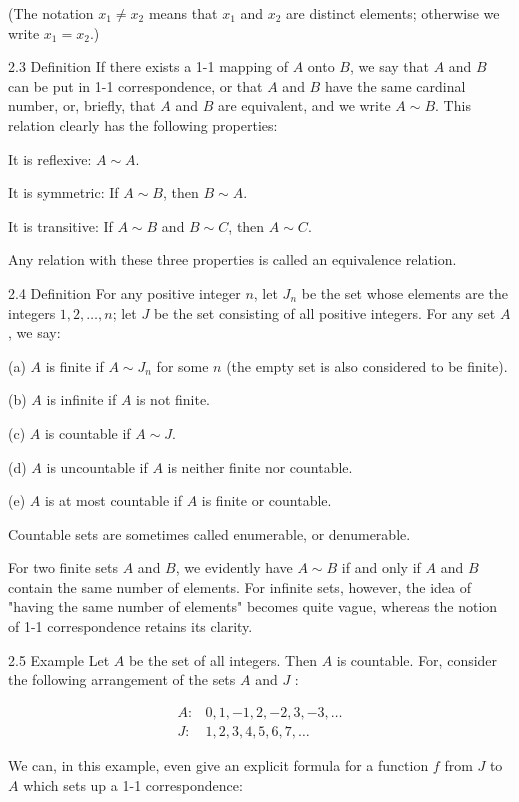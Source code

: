 \documentclass[10pt]{article}
\begin{document}
(The notation $x_{1} \neq x_{2}$ means that $x_{1}$ and $x_{2}$ are distinct elements; otherwise we write $x_{1}=x_{2}$.)

2.3 Definition If there exists a 1-1 mapping of $A$ onto $B$, we say that $A$ and $B$ can be put in 1-1 correspondence, or that $A$ and $B$ have the same cardinal number, or, briefly, that $A$ and $B$ are equivalent, and we write $A \sim B$. This relation clearly has the following properties:

It is reflexive: $A \sim A$.

It is symmetric: If $A \sim B$, then $B \sim A$.

It is transitive: If $A \sim B$ and $B \sim C$, then $A \sim C$.

Any relation with these three properties is called an equivalence relation.

2.4 Definition For any positive integer $n$, let $J_{n}$ be the set whose elements are the integers $1,2, \ldots, n$; let $J$ be the set consisting of all positive integers. For any set $A$, we say:

(a) $A$ is finite if $A \sim J_{n}$ for some $n$ (the empty set is also considered to be finite).

(b) $A$ is infinite if $A$ is not finite.

(c) $A$ is countable if $A \sim J$.

(d) $A$ is uncountable if $A$ is neither finite nor countable.

(e) $A$ is at most countable if $A$ is finite or countable.

Countable sets are sometimes called enumerable, or denumerable.

For two finite sets $A$ and $B$, we evidently have $A \sim B$ if and only if $A$ and $B$ contain the same number of elements. For infinite sets, however, the idea of "having the same number of elements" becomes quite vague, whereas the notion of 1-1 correspondence retains its clarity.

2.5 Example Let $A$ be the set of all integers. Then $A$ is countable. For, consider the following arrangement of the sets $A$ and $J$ :

$$
\begin{array}{ll}
A: & 0,1,-1,2,-2,3,-3, \ldots \\
J: & 1,2,3,4,5,6,7, \ldots
\end{array}
$$

We can, in this example, even give an explicit formula for a function $f$ from $J$ to $A$ which sets up a 1-1 correspondence:
\end{document}
